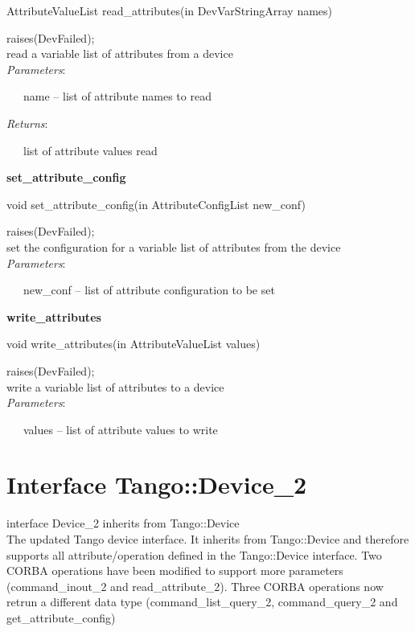 AttributeValueList read\_attributes(in DevVarStringArray names)

raises(DevFailed);\\


read a variable list of attributes from a device\\


\emph{Parameters}:

~~~name -- list of attribute names to read

\emph{Returns}:

~~~list of attribute values read\\


\begin{flushleft}
\textbf{set\_attribute\_config}
\par\end{flushleft}

void set\_attribute\_config(in AttributeConfigList new\_conf)

raises(DevFailed);\\


set the configuration for a variable list of attributes from the device\\


\emph{Parameters}:

~~~new\_conf -- list of attribute configuration to be set\\


\begin{flushleft}
\textbf{write\_attributes}
\par\end{flushleft}

void write\_attributes(in AttributeValueList values)

raises(DevFailed);\\


write a variable list of attributes to a device\\


\emph{Parameters}:

~~~values -- list of attribute values to write


\section{Interface Tango::Device\_2}

interface Device\_2 inherits from Tango::Device\\


The updated Tango device interface. It inherits from Tango::Device
and therefore supports all attribute/operation defined in the Tango::Device
interface. Two CORBA operations have been modified to support more
parameters (command\_inout\_2 and  read\_attribute\_2). Three CORBA
operations now retrun a different data type (command\_list\_query\_2,
command\_query\_2 and get\_attribute\_config)


